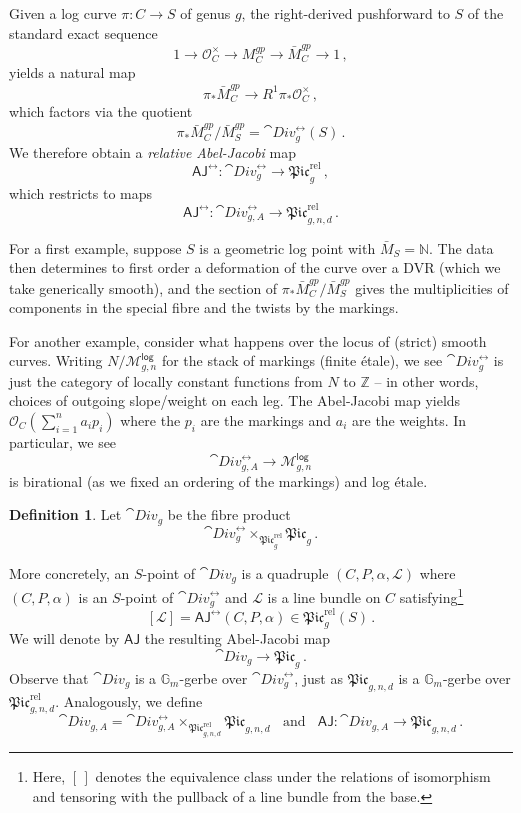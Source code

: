\documentclass[a4paper,12pt]{article} %
\newcommand{\bb}[1]{{\mathbb{#1}}}
\newcommand{\ca}[1]{{\mathcal{#1}}}
\theoremstyle{definition}
\newtheorem{definition}{Definition} %
\theoremstyle{plain}%
\newcommand{\aj}{{\scriptstyle \mathsf{AJ}}}
\newcommand{\Picabs}{\mathfrak{Pic}}
\newcommand{\Picrel}{\mathfrak{Pic}^{\mathrm{rel}}}
\begin{document}
Given a log curve $\pi\colon C \to S$ of genus $g$,  the right-derived pushforward to $S$ of the standard exact sequence
\begin{equation}\label{eq:log_exact_seq}
1 \to \ca O_C^\times \to M_C^{gp} \to \bar M_C^{gp} \to 1\, ,
\end{equation}
yields a natural map 
$$\pi_*\bar M_C^{gp} \to R^1\pi_*\ca O_C^\times\, ,$$
which factors via the quotient $$\pi_*\bar M_C^{gp}/\bar M_S^{gp} = \cat{Div}^{\rel}_g(S)\, .$$ We therefore obtain
a \emph{relative Abel-Jacobi} map $$\aj^{\rel}\colon \cat{Div}^{\rel}_{g} \to \Picrel_{g}\, ,$$ 
which restricts to maps 
$$\aj^{\rel}\colon \cat{Div}^{\rel}_{g,A} \to \Picrel_{g,n,d}\, .$$ 

For a first example, suppose $S$ is a geometric log point with $\bar M_S = \bb N$. 
The data then determines
to first order a deformation of the curve over a DVR (which we take generically smooth),  and the section of $\pi_*\bar M_C^{gp}/\bar M_S^{gp}$ gives the multiplicities of components in the special fibre and the twists by the markings. 

For another example, consider what happens over the locus of (strict) smooth curves. Writing $N/\ca M^{\mathsf{log}}_{g,n}$ for the stack of markings (finite \'etale), we see $\cat{Div}^{\rel}_g$ is just the category of locally constant functions from $N$ to $\bb Z$ -- in other words, choices of outgoing slope/weight on each leg. 
The Abel-Jacobi map yields  $\ca O_C(\sum_{i=1}^n a_ip_i)$ where 
the $p_i$ are the markings and $a_i$ are the weights. In particular, we see  $$\cat{Div}^{\rel}_{g,A} \to \ca M^{\mathsf{log}}_{g,n}$$
is birational (as we fixed an ordering of the markings) and log \'etale. 

\begin{definition}\label{def:div}
Let  $\cat{Div}_{g}$ be the fibre product 
\begin{equation}
\cat{Div}^{\rel}_{g} \times_{\Picrel_{g}}\Picabs_{g}\, .
\end{equation}
\end{definition}

More concretely, an $S$-point of $\cat{Div}_{g}$ is a quadruple $(C,P,\alpha,\ca L)$ where $(C, P, \alpha)$ is an $S$-point of $\cat{Div}^{\rel}_{g}$ and $\ca L$ is a line bundle on $C$ satisfying{\footnote{Here, $[\,]$ denotes the
equivalence class under the relations of isomorphism and tensoring with the pullback of a line bundle from the base. }}%
$$[\ca L] = \aj^{\rel}(C, P, \alpha)\in \Picrel_{g}(S)\, .$$ 
We will denote by $\aj$ the resulting Abel-Jacobi map 
$$\cat{Div}_g \to \Picabs_{g}\, .$$
Observe that $\cat{Div}_g$ is a $\bb G_m$-gerbe over $\cat{Div}^{\rel}_{g}$, just as $\Picabs_{g,n,d}$ is a $\bb G_m$-gerbe over $\Picrel_{g,n, d}$. 
Analogously,
we define  
\begin{equation}
\cat{Div}_{g,A} = \cat{Div}^{\rel}_{g,A} \times_{\Picrel_{g,n,d}}\Picabs_{g,n,d}
\ \ \ \ 
\text{and} 
\ \ \ \ \aj\colon \cat{Div}_{g,A} \to \Picabs_{g,n,d}\, .
\end{equation}
\end{document}
